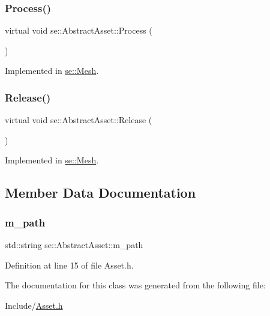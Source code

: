 \subsubsection{\texorpdfstring{Process()}{Process()}}
{\footnotesize\ttfamily virtual void se\+::\+Abstract\+Asset\+::\+Process (\begin{DoxyParamCaption}{ }\end{DoxyParamCaption})\hspace{0.3cm}{\ttfamily [pure virtual]}}



Implemented in \mbox{\hyperlink{classse_1_1_mesh_a1ae42a794ee240b5d6a0dd46aa4ea60d}{se\+::\+Mesh}}.

\mbox{\label{classse_1_1_abstract_asset_aea97e36f647efdb07a801b6fc468388d}} 
\subsubsection{\texorpdfstring{Release()}{Release()}}
{\footnotesize\ttfamily virtual void se\+::\+Abstract\+Asset\+::\+Release (\begin{DoxyParamCaption}{ }\end{DoxyParamCaption})\hspace{0.3cm}{\ttfamily [pure virtual]}}



Implemented in \mbox{\hyperlink{classse_1_1_mesh_afde4ccf6665a9b6c7a8f3635dd5139e0}{se\+::\+Mesh}}.



\subsection{Member Data Documentation}
\mbox{\label{classse_1_1_abstract_asset_afa609af58ca8617ef9ab7f6de84e121f}} 
\subsubsection{\texorpdfstring{m\+\_\+path}{m\_path}}
{\footnotesize\ttfamily std\+::string se\+::\+Abstract\+Asset\+::m\+\_\+path\hspace{0.3cm}{\ttfamily [protected]}}



Definition at line 15 of file Asset.\+h.



The documentation for this class was generated from the following file\+:\begin{DoxyCompactItemize}
\item 
Include/\mbox{\hyperlink{_asset_8h}{Asset.\+h}}\end{DoxyCompactItemize}

